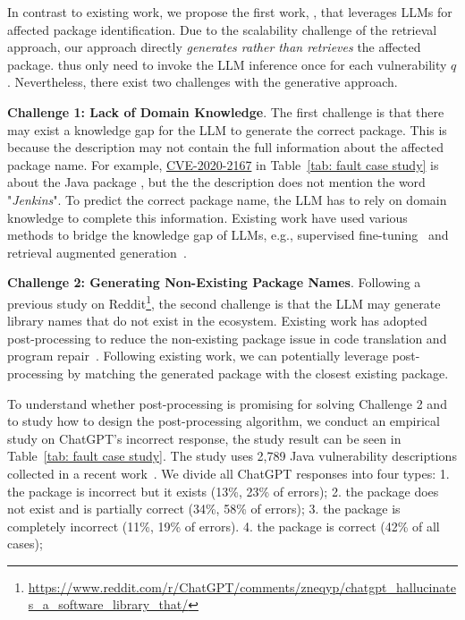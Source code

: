 In contrast to existing work, we propose the first work, \detector{}, that leverages LLMs for affected package identification. Due to the scalability challenge of the retrieval approach, our approach directly \emph{generates rather than retrieves} the affected package. \detector{} thus only need to invoke the LLM inference once for each vulnerability $q$.  
Nevertheless, there exist two challenges with the generative approach. 

\noindent \textbf{Challenge 1: Lack of Domain Knowledge}. The first challenge is that there may exist a knowledge gap for the LLM to generate the correct package. This is because the description may not contain the full information about the affected package name. For example, \href{https://github.com/advisories/GHSA-264w-xrr7-6qqg}{CVE-2020-2167} in Table~\ref{tab: fault case study} is about the Java package , but the the description does not mention the word "\emph{Jenkins}". To predict the correct package name, the LLM has to rely on domain knowledge to complete this information. Existing work have used various methods to bridge the knowledge gap of LLMs, e.g., supervised fine-tuning~\cite{prottasha2022transfer, church2021emerging} and retrieval augmented generation~\cite{lewis2020retrieval,
mao2020generation, liu2020retrieval, cai2022recent}. 


\noindent \textbf{Challenge 2: Generating Non-Existing Package Names}. Following a previous study on Reddit\footnote{\url{https://www.reddit.com/r/ChatGPT/comments/zneqyp/chatgpt\_hallucinates\_a\_software\_library\_that/}}, the second challenge is that the LLM may generate library names that do not exist in the ecosystem. Existing work has adopted post-processing to reduce the non-existing package issue in code translation and program repair~\cite{jin2023inferfix, roziere2021leveraging}. Following existing work, we can potentially leverage post-processing by matching the generated package with the closest existing package.  %

To understand whether post-processing is promising for solving Challenge 2 and to study how to design the post-processing algorithm, we conduct an empirical study on ChatGPT's incorrect response, the study result can be seen in Table~\ref{tab: fault case study}. The study uses 2,789 Java vulnerability descriptions collected in a recent work~\cite{vullibminer}. We divide all ChatGPT responses into four types: 1. the package is incorrect but it exists (13\%, 23\% of errors); 2. the package does not exist and is partially correct (34\%, 58\% of errors); 3. the package is completely incorrect (11\%, 19\% of errors). 4. the package is correct (42\% of all cases); 

